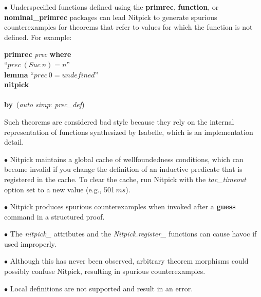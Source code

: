 \documentclass[a4paper,12pt]{article}
\def\undef{\textit{undefined}}
\begin{document}
\begin{enum}
\item[$\bullet$] Underspecified functions defined using the \textbf{primrec},
\textbf{function}, or \textbf{nominal\_\allowbreak primrec} packages can lead
Nitpick to generate spurious counterexamples for theorems that refer to values
for which the function is not defined. For example:

\prew
\textbf{primrec} \textit{prec} \textbf{where} \\
``$\textit{prec}~(\textit{Suc}~n) = n$'' \\[2\smallskipamount]
\textbf{lemma} ``$\textit{prec}~0 = \undef$'' \\
\textbf{nitpick} \\[2\smallskipamount]
 \nopagebreak\\[2\smallskipamount]
\textbf{by}~(\textit{auto simp}: \textit{prec\_def})
\postw

Such theorems are considered bad style because they rely on the internal
representation of functions synthesized by Isabelle, which is an implementation
detail.

\item[$\bullet$] Nitpick maintains a global cache of wellfoundedness conditions,
which can become invalid if you change the definition of an inductive predicate
that is registered in the cache. To clear the cache,
run Nitpick with the \textit{tac\_timeout} option set to a new value (e.g.,
501$\,\textit{ms}$).

\item[$\bullet$] Nitpick produces spurious counterexamples when invoked after a
\textbf{guess} command in a structured proof.

\item[$\bullet$] The \textit{nitpick\_} attributes and the
\textit{Nitpick.register\_} functions can cause havoc if used improperly.

\item[$\bullet$] Although this has never been observed, arbitrary theorem
morphisms could possibly confuse Nitpick, resulting in spurious counterexamples.

\item[$\bullet$] Local definitions are not supported and result in an error.

\end{enum}

\let\em=\sl
{}

\end{document}
